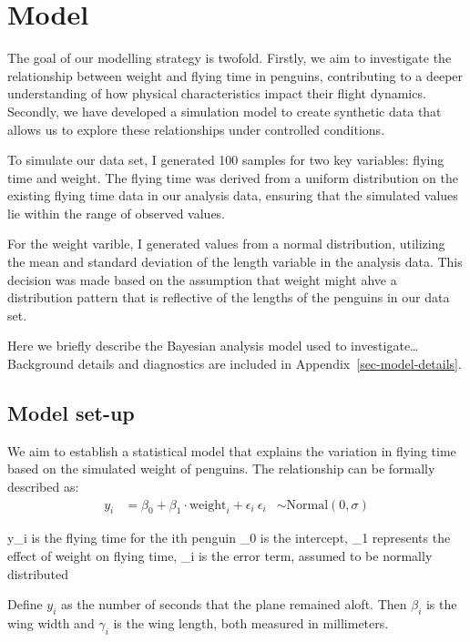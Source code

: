 \documentclass[
  letterpaper,
  DIV=11,
  numbers=noendperiod]{scrartcl}
\begin{document}
\section{Model}\label{model}

The goal of our modelling strategy is twofold. Firstly, we aim to
investigate the relationship between weight and flying time in penguins,
contributing to a deeper understanding of how physical characteristics
impact their flight dynamics. Secondly, we have developed a simulation
model to create synthetic data that allows us to explore these
relationships under controlled conditions.

To simulate our data set, I generated 100 samples for two key variables:
flying time and weight. The flying time was derived from a uniform
distribution on the existing flying time data in our analysis data,
ensuring that the simulated values lie within the range of observed
values.

For the weight varible, I generated values from a normal distribution,
utilizing the mean and standard deviation of the length variable in the
analysis data. This decision was made based on the assumption that
weight might ahve a distribution pattern that is reflective of the
lengths of the penguins in our data set.

Here we briefly describe the Bayesian analysis model used to
investigate\ldots{} Background details and diagnostics are included in
Appendix~\ref{sec-model-details}.

\subsection{Model set-up}\label{model-set-up}

We aim to establish a statistical model that explains the variation in
flying time based on the simulated weight of penguins. The relationship
can be formally described as:
\begin{align} y_i &= \beta_0 + \beta_1 \cdot \text{weight}_i + \epsilon_i \ \epsilon_i &\sim \mbox{Normal}(0, \sigma) \end{align}

y\_i is the flying time for the ith penguin \beta\_0 is the intercept,
\beta\_1 represents the effect of weight on flying time, \epsilon\_i is
the error term, assumed to be normally distributed

Define \(y_i\) as the number of seconds that the plane remained aloft.
Then \(\beta_i\) is the wing width and \(\gamma_i\) is the wing length,
both measured in millimeters.
\end{document}
